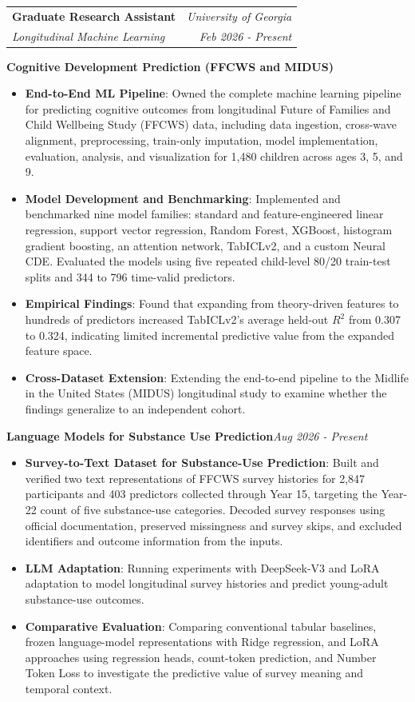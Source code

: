\documentclass[a4paper,10pt]{article}
\makeatletter
\newcommand{\resumeSubheading}[4]{
  \Needspace{10\baselineskip}
  \item
    \begin{tabular*}{0.97\textwidth}{l@{\extracolsep{\fill}}r}
      \textbf{#1} & \textit{#2} \\
      \textit{\small#3} & \textit{\small#4} \\
    \end{tabular*}
}
\newcommand{\resumeItem}[2]{\item \small{\textbf{#1}{: #2 \vspace{-2pt}}}}
\newcommand{\resumeItemListStart}{\begin{itemize}}
\newcommand{\resumeItemListEnd}{\end{itemize}}
\makeatother
\begin{document}
    \resumeSubheading
        {Graduate Research Assistant}{University of Georgia}
        {Longitudinal Machine Learning}{Feb 2026 - Present}
        \par\smallskip\noindent
        {\small\textbf{Cognitive Development Prediction (FFCWS and MIDUS)}}\par
        \resumeItemListStart
            \resumeItem{End-to-End ML Pipeline}
                {Owned the complete machine learning pipeline for predicting cognitive outcomes from longitudinal Future of Families and Child Wellbeing Study (FFCWS) data, including data ingestion, cross-wave alignment, preprocessing, train-only imputation, model implementation, evaluation, analysis, and visualization for 1,480 children across ages 3, 5, and 9.}
            \resumeItem{Model Development and Benchmarking}
                {Implemented and benchmarked nine model families: standard and feature-engineered linear regression, support vector regression, Random Forest, XGBoost, histogram gradient boosting, an attention network, TabICLv2, and a custom Neural CDE. Evaluated the models using five repeated child-level 80/20 train-test splits and 344 to 796 time-valid predictors.}
            \resumeItem{Empirical Findings}
                {Found that expanding from theory-driven features to hundreds of predictors increased TabICLv2's average held-out $R^2$ from 0.307 to 0.324, indicating limited incremental predictive value from the expanded feature space.}
            \resumeItem{Cross-Dataset Extension}
                {Extending the end-to-end pipeline to the Midlife in the United States (MIDUS) longitudinal study to examine whether the findings generalize to an independent cohort.}
        \resumeItemListEnd
        \par\smallskip\noindent
        {\small\textbf{Language Models for Substance Use Prediction}\hfill\textit{Aug 2026 - Present}}\par
        \resumeItemListStart
            \resumeItem{Survey-to-Text Dataset for Substance-Use Prediction}
                {Built and verified two text representations of FFCWS survey histories for 2,847 participants and 403 predictors collected through Year 15, targeting the Year-22 count of five substance-use categories. Decoded survey responses using official documentation, preserved missingness and survey skips, and excluded identifiers and outcome information from the inputs.}
            \resumeItem{LLM Adaptation}
                {Running experiments with DeepSeek-V3 and LoRA adaptation to model longitudinal survey histories and predict young-adult substance-use outcomes.}
            \resumeItem{Comparative Evaluation}
                {Comparing conventional tabular baselines, frozen language-model representations with Ridge regression, and LoRA approaches using regression heads, count-token prediction, and Number Token Loss to investigate the predictive value of survey meaning and temporal context.}
        \resumeItemListEnd
\end{document}
